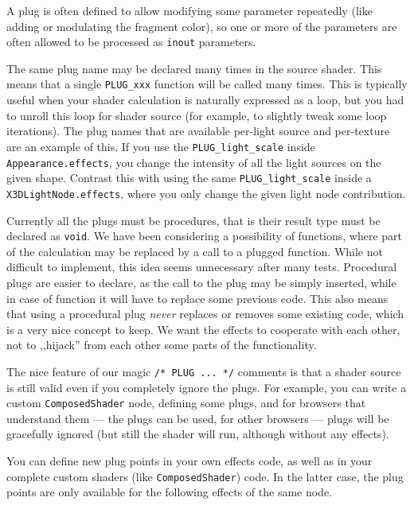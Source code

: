 \documentclass{acmsiggraph}                     %
\begin{document}
A plug is often defined to allow modifying some parameter
repeatedly (like adding or modulating the fragment color),
so one or more of the parameters are often allowed to be processed
as \texttt{inout} parameters.

The same plug name may be declared many times in the source shader.
This means that a single \texttt{PLUG\_xxx} function will be called
many times. This is typically useful when your shader calculation is naturally
expressed as a loop, but you had to unroll this loop for shader source
(for example, to slightly tweak some loop iterations).
The plug names that are available per-light source and per-texture
are an example of this.
If you use the \texttt{PLUG\_light\_scale}
inside \texttt{Appearance.effects}, you change the intensity
of all the light sources on the given shape. Contrast this with using
the same \texttt{PLUG\_light\_scale} inside a \texttt{X3DLightNode.effects},
where you only change the given light node contribution.

Currently all the plugs must be procedures, that is their result type
must be declared as \texttt{void}. We have been considering
a possibility of functions, where part of the calculation may be replaced
by a call to a plugged function. While not difficult to implement,
this idea seems unnecessary after many tests.
Procedural plugs are easier to declare, as the call to the plug
may be simply inserted, while in case of function it will have to replace
some previous code. This also means that using a procedural plug
\textit{never} replaces or removes some existing code, which is a very nice
concept to keep. We want the effects to cooperate with each other,
not to ,,hijack'' from each other some parts of the functionality.

The nice feature of our magic \texttt{/* PLUG ... */} comments is that a shader source
is still valid even if you completely ignore the plugs. For example,
you can write a custom \texttt{ComposedShader} node, defining some plugs,
and for browsers that understand them --- the plugs can be used,
for other browsers --- plugs will be gracefully ignored (but still
the shader will run, although without any effects).

You can define new plug points in your own effects code, as well as in your
complete custom shaders (like \texttt{ComposedShader}) code.
In the latter case, the plug points
are only available for the following effects of the same node.
\end{document}
